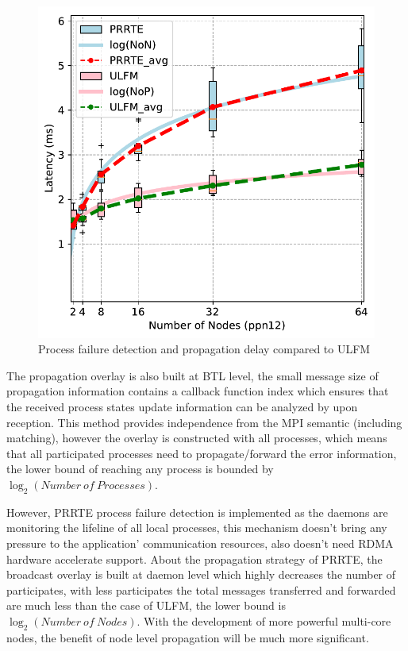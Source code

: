 \documentclass[sigconf]{acmart}
\newcommand{\prrte}[0]{\textsc{PRRTE}\xspace}
\newcommand{\ulfm}[0]{\textsc{ULFM}\xspace}
\newcommand{\mpi}[0]{\textsc{MPI}\xspace}
\begin{document}
\begin{figure}[h]
  \centering
  \includegraphics[width=\linewidth]{Process_Failure_log_fit.pdf}
  \caption{Process failure detection and propagation delay compared to \ulfm}
  \label{fig:proc_failure_nacl}
\end{figure}

The propagation overlay is also built at BTL level, the small message size of propagation information contains a callback function index which ensures that the received process states update information can be analyzed by upon reception. This method provides independence from the \mpi semantic (including matching), however the overlay is constructed with all processes, which means that all participated processes need to propagate/forward the error information, the lower bound of reaching any process is bounded by $\log_2({Number\ of\ Processes})$.  

However, \prrte process failure detection is implemented as the daemons are monitoring the lifeline of all local processes, this mechanism doesn't bring any pressure to the application' communication resources, also doesn't need RDMA hardware accelerate support. About the propagation strategy of \prrte, the broadcast overlay is built at daemon level which highly decreases the number of participates, with less participates the total messages transferred and forwarded are much less than the case of \ulfm, the lower bound is $\log_2({Number\ of\ Nodes})$. With the development of more powerful multi-core nodes, the benefit of node level propagation will be much more significant.
\end{document}
